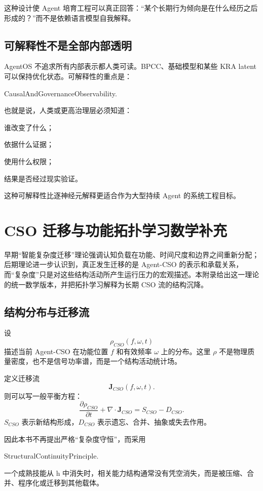 这种设计使 Agent 培育工程可以真正回答：“某个长期行为倾向是在什么经历之后形成的？”而不是依赖语言模型自我解释。

\section{可解释性不是全部内部透明}

AgentOS 不追求所有内部表示都人类可读。BPCC、基础模型和某些 KRA latent 可以保持优化状态。可解释性的重点是：
\begin{statementbox}
CausalAndGovernanceObservability.
\end{statementbox}
也就是说，人类或更高治理层必须知道：

谁改变了什么；

依据什么证据；

使用什么权限；

结果是否经过现实验证。

这种可解释性比逐神经元解释更适合作为大型持续 Agent 的系统工程目标。


\chapter{CSO 迁移与功能拓扑学习数学补充}
\label{app:cso_dynamics}

\begin{chapterlead}
早期“智能复杂度迁移”理论强调认知负载在功能、时间尺度和边界之间重新分配；后期理论进一步认识到，真正发生迁移的是 Agent-CSO 的表示和承载关系，而“复杂度”只是对这些结构活动所产生运行压力的宏观描述。本附录给出这一理论的统一数学版本，并把拓扑学习解释为长期 CSO 流的结构沉降。
\end{chapterlead}

\section{结构分布与迁移流}

设
\[
\rho_{CSO}(f,\omega,t)
\]
描述当前 Agent-CSO 在功能位置 $f$ 和有效频率 $\omega$ 上的分布。这里 $\rho$ 不是物理质量密度，也不是信号功率谱，而是一个结构活动统计场。

定义迁移流
\[
\mathbf J_{CSO}(f,\omega,t).
\]
则可以写一般平衡方程：
\[
\frac{\partial\rho_{CSO}}{\partial t}
+
\nabla\cdot\mathbf J_{CSO}
=
S_{CSO}-D_{CSO}.
\]
$S_{CSO}$ 表示新结构形成，$D_{CSO}$ 表示遗忘、合并、抽象或失去作用。

因此本书不再提出严格“复杂度守恒”，而采用
\begin{statementbox}
StructuralContinuityPrinciple.
\end{statementbox}
一个成熟技能从 h 中消失时，相关能力结构通常没有凭空消失，而是被压缩、合并、程序化或迁移到其他载体。

